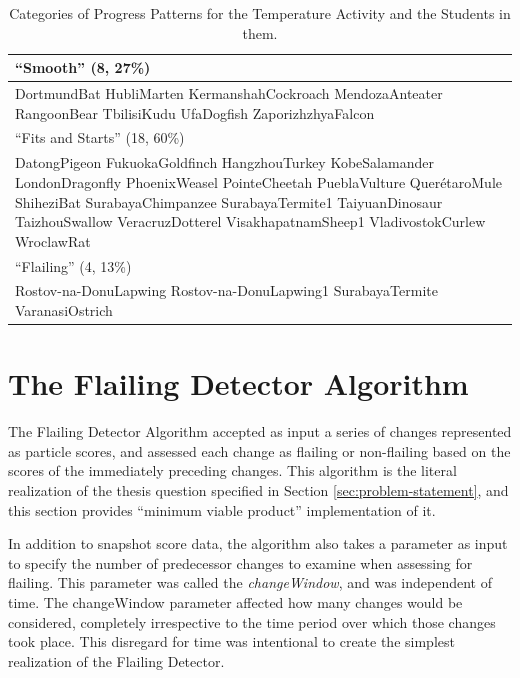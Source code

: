 \begin{table}
\begin{centering}
	\begin{tabular}{p{\textwidth}}
	\hline \hline
	``Smooth'' (8, 27\%)\\ \hline
		DortmundBat
		HubliMarten
		KermanshahCockroach
		MendozaAnteater
		RangoonBear
		TbilisiKudu
		UfaDogfish
		ZaporizhzhyaFalcon
		\\ \hline \hline
	``Fits and Starts'' (18, 60\%)\\ \hline
		DatongPigeon
		FukuokaGoldfinch
		HangzhouTurkey
		KobeSalamander
		LondonDragonfly
		PhoenixWeasel
		PointeCheetah
		PueblaVulture
		QuerétaroMule
		ShiheziBat
		SurabayaChimpanzee
		SurabayaTermite1
		TaiyuanDinosaur
		TaizhouSwallow
		VeracruzDotterel
		VisakhapatnamSheep1
		VladivostokCurlew
		WroclawRat
		\\ \hline \hline
	``Flailing'' (4, 13\%)\\ \hline
		Rostov-na-DonuLapwing
		Rostov-na-DonuLapwing1
		SurabayaTermite
		VaranasiOstrich
		\\ \hline

	\end{tabular}
	\caption[Categories of Progress Patterns for the Temperature Activity and the Students in them]{Categories of Progress Patterns for the Temperature Activity and the Students in them.}
	\label{tab:pattern_names_temp}
\end{centering}
\end{table}



\section{The Flailing Detector Algorithm}
\label{sec:the-flailing-detector}
The Flailing Detector Algorithm accepted as input a series of changes represented as particle scores, and assessed each change as flailing or non-flailing based on the scores of the immediately preceding changes. This algorithm is the literal realization of the thesis question specified in Section \ref{sec:problem-statement}, and this section provides ``minimum viable product'' implementation of it.

In addition to snapshot score data, the algorithm also takes a parameter as input to specify the number of predecessor changes to examine when assessing for flailing. This parameter was called the \emph{changeWindow}, and was independent of time. The changeWindow parameter affected how many changes would be considered, completely irrespective to the time period over which those changes took place. This disregard for time was intentional to create the simplest realization of the Flailing Detector.

